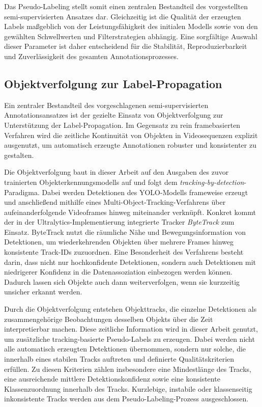 Das Pseudo-Labeling stellt somit einen zentralen Bestandteil des vorgestellten
semi-supervisierten Ansatzes dar. Gleichzeitig ist die Qualität der erzeugten
Labels maßgeblich von der Leistungsfähigkeit des initialen Modells sowie von den
gewählten Schwellwerten und Filterstrategien abhängig. Eine sorgfältige Auswahl
dieser Parameter ist daher entscheidend für die Stabilität, Reproduzierbarkeit und
Zuverlässigkeit des gesamten Annotationsprozesses.

\subsection{Objektverfolgung zur Label-Propagation}

Ein zentraler Bestandteil des vorgeschlagenen semi-supervisierten
Annotationsansatzes ist der gezielte Einsatz von Objektverfolgung zur
Unterstützung der Label-Propagation. Im Gegensatz zu rein framebasierten
Verfahren wird die zeitliche Kontinuität von Objekten in Videosequenzen explizit
ausgenutzt, um automatisch erzeugte Annotationen robuster und konsistenter zu
gestalten.

Die Objektverfolgung baut in dieser Arbeit auf den Ausgaben des zuvor trainierten
Objekterkennungsmodells auf und folgt dem \emph{tracking-by-detection}-Paradigma.
Dabei werden Detektionen des YOLO-Modells frameweise erzeugt und anschließend
mithilfe eines Multi-Object-Tracking-Verfahrens über aufeinanderfolgende
Videoframes hinweg miteinander verknüpft. Konkret kommt der in der
Ultralytics-Implementierung integrierte Tracker \textit{ByteTrack} zum Einsatz.
ByteTrack nutzt die räumliche Nähe und Bewegungsinformation von Detektionen,
um wiederkehrenden Objekten über mehrere Frames hinweg konsistente Track-IDs
zuzuordnen. Eine Besonderheit des Verfahrens besteht darin, dass nicht nur
hochkonfidente Detektionen, sondern auch Detektionen mit niedrigerer Konfidenz
in die Datenassoziation einbezogen werden können. Dadurch lassen sich Objekte
auch dann weiterverfolgen, wenn sie kurzzeitig unsicher erkannt werden.

Durch die Objektverfolgung entstehen Objekttracks, die einzelne Detektionen als
zusammengehörige Beobachtungen desselben Objekts über die Zeit interpretierbar
machen. Diese zeitliche Information wird in dieser Arbeit genutzt, um zusätzliche
tracking-basierte Pseudo-Labels zu erzeugen. Dabei werden nicht alle automatisch
erzeugten Detektionen übernommen, sondern nur solche, die innerhalb eines
stabilen Tracks auftreten und definierte Qualitätskriterien erfüllen. Zu diesen
Kriterien zählen insbesondere eine Mindestlänge des Tracks, eine ausreichende
mittlere Detektionskonfidenz sowie eine konsistente Klassenzuordnung innerhalb
des Tracks. Kurzlebige, instabile oder klassenseitig inkonsistente Tracks werden
aus dem Pseudo-Labeling-Prozess ausgeschlossen.

